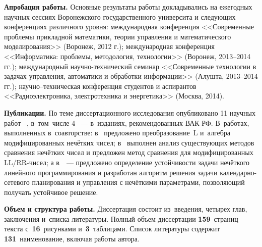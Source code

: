 \textbf{Апробация работы.} Основные результаты работы докладывались на ежегодных научных сессиях Воронежского государственного университа и следующих конференциях различного уровня: международная конференция <<Современные проблемы прикладной математики, теории управления и математического моделирования>> (Воронеж, 2012 г.); международная конференция <<Информатика: проблемы, методология, технологии>> (Воронеж, 2013--2014 гг.); международный научно-технический семинар <<Современные технологии в задачах управления, автоматики и обработки информации>> (Алушта, 2013--2014 гг.); научно--техническая конференция студентов и аспирантов <<Радиоэлектроника, электротехника и энергетика>> (Москва, 2014).

\textbf{Публикации.} По теме диссертационного исследования опубликовано 11 научных работ \cite{PMTYMM}--\cite{Kanischeva}, в~том~числе 4 \cite{Kanischeva, Vorontsov_Compare, Vorontsov_PI, Vorontsov_VSTU}~--- в~изданиях, рекомендованных ВАК РФ. В~работах, выполненных в~соавторстве: в~\cite{Vorontsov_PI} предложено преобразование~L и~алгебра модифицированных нечётких чисел; в~\cite{Vorontsov_Compare} выполнен анализ существующих методов сравнения нечётких чисел и предложен метод сравнения для модифицированных LL/RR-чисел; а в~\cite{Vorontsov_VSTU}~--- предложено определение устойчивости задачи нечёткого линейного программирования и разработан алгоритм решения задачи календарно-сетевого планирования и управления с нечёткими параметрами, позволяющий получать устойчивое решение.

\textbf{Объем и структура работы.} Диссертация состоит из~введения, четырех глав, заключения и~списка литературы. Полный объем диссертации \textbf{159}~страниц текста с~\textbf{16}~рисунками и~\textbf{3}~таблицами. Список литературы содержит \textbf{131}~наименование, включая работы автора.